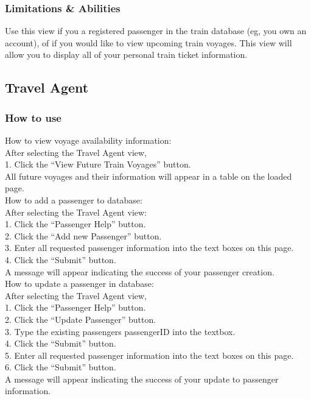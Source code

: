 \documentclass[letter]{article}
\begin{document}
\subsubsection{Limitations \& Abilities}
Use this view if you a registered passenger in the train database (eg, you own an account), of if you would like to view upcoming train voyages. This view will allow you to display all of your personal train ticket information.

\subsection{Travel Agent}
\subsubsection{How to use}

How to view voyage availability information:\\
After selecting the Travel Agent view,\\  
1. Click the “View Future Train Voyages” button. \\
All future voyages and their information will appear in a table on the loaded page.\\ 


How to add a passenger to database:\\
After selecting the Travel Agent view:\\
1. Click the “Passenger Help” button.\\
2. Click the “Add new Passenger” button. \\
3. Enter all requested passenger information into the text boxes on this page.\\
4. Click the “Submit” button.\\
A message will appear indicating the success of your passenger creation.\\


How to update a passenger in database:\\
After selecting the Travel Agent view,\\
1. Click the “Passenger Help” button.\\
2. Click the “Update Passenger” button.\\
3. Type the existing passengers passengerID into the textbox.\\
4. Click the “Submit” button. \\
5. Enter all requested passenger information into the text boxes on this page.\\
6. Click the “Submit” button.\\
A message will appear indicating the success of your update to passenger information.\\ 
\end{document}
